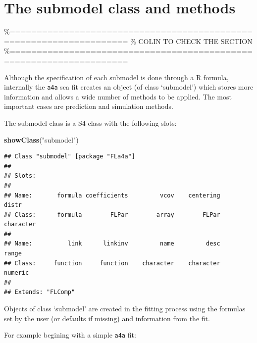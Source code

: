 \documentclass[
]{book}
\newenvironment{Shaded}{\begin{snugshade}}{\end{snugshade}}
\newcommand{\FunctionTok}[1]{\textcolor[rgb]{0.13,0.29,0.53}{\textbf{#1}}}
\newcommand{\NormalTok}[1]{#1}
\newcommand{\StringTok}[1]{\textcolor[rgb]{0.31,0.60,0.02}{#1}}
\begin{document}
\hypertarget{the-submodel-class-and-methods}{%
\section{The submodel class and methods}\label{the-submodel-class-and-methods}}

\%====================================================================
\% COLIN TO CHECK THE SECTION
\%====================================================================

Although the specification of each submodel is done through a R formula, internally the \texttt{a4a} sca fit creates an object (of class `submodel') which stores more information and allows a wide number of methods to be applied. The most important cases are prediction and simulation methods.

The submodel class is a S4 class with the following slots:

\begin{Shaded}
\begin{Highlighting}[]
\FunctionTok{showClass}\NormalTok{(}\StringTok{"submodel"}\NormalTok{)}
\end{Highlighting}
\end{Shaded}

\begin{verbatim}
## Class "submodel" [package "FLa4a"]
## 
## Slots:
##                                                                        
## Name:       formula coefficients         vcov    centering        distr
## Class:      formula        FLPar        array        FLPar    character
##                                                                        
## Name:          link      linkinv         name         desc        range
## Class:     function     function    character    character      numeric
## 
## Extends: "FLComp"
\end{verbatim}

Objects of class `submodel' are created in the fitting process using the formulas set by the user (or defaults if missing) and information from the fit.

For example begining with a simple \texttt{a4a} fit:
\end{document}
